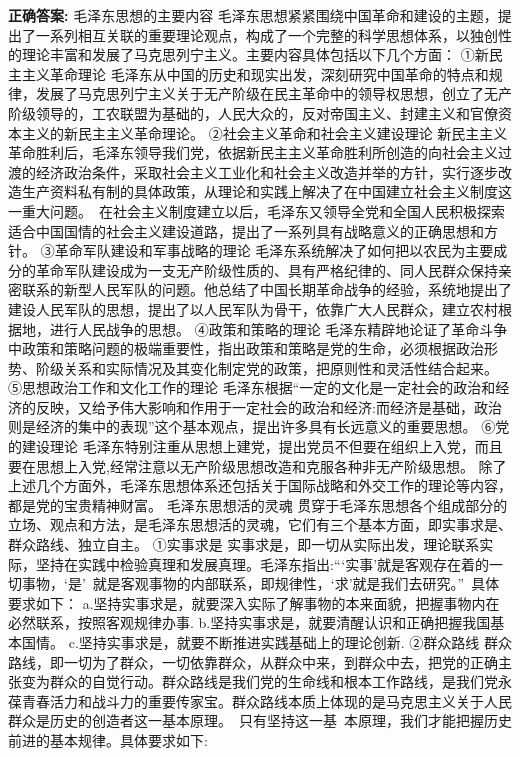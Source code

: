\documentclass[12pt,UTF8]{ctexart}
\begin{document}
\textbf{正确答案:}
毛泽东思想的主要内容
毛泽东思想紧紧围绕中国革命和建设的主题，提出了一系列相互关联的重要理论观点，构成了一个完整的科学思想体系，以独创性的理论丰富和发展了马克思列宁主义。主要内容具体包括以下几个方面：
①新民主主义革命理论
毛泽东从中国的历史和现实出发，深刻研究中国革命的特点和规律，发展了马克思列宁主义关于无产阶级在民主革命中的领导权思想，创立了无产阶级领导的，工农联盟为基础的，人民大众的，反对帝国主义、封建主义和官僚资本主义的新民主主义革命理论。
②社会主义革命和社会主义建设理论
新民主主义革命胜利后，毛泽东领导我们党，依据新民主主义革命胜利所创造的向社会主义过渡的经济政治条件，采取社会主义工业化和社会主义改造并举的方针，实行逐步改造生产资料私有制的具体政策，从理论和实践上解决了在中国建立社会主义制度这一重大问题。 在社会主义制度建立以后，毛泽东又领导全党和全国人民积极探索适合中国国情的社会主义建设道路，提出了一系列具有战略意义的正确思想和方针。
③革命军队建设和军事战略的理论
毛泽东系统解决了如何把以农民为主要成分的革命军队建设成为一支无产阶级性质的、具有严格纪律的、同人民群众保持亲密联系的新型人民军队的问题。他总结了中国长期革命战争的经验，系统地提出了建设人民军队的思想，提出了以人民军队为骨干，依靠广大人民群众，建立农村根据地，进行人民战争的思想。
④政策和策略的理论
毛泽东精辟地论证了革命斗争中政策和策略问题的极端重要性，指出政策和策略是党的生命，必须根据政治形势、阶级关系和实际情况及其变化制定党的政策，把原则性和灵活性结合起来。
⑤思想政治工作和文化工作的理论
毛泽东根据“一定的文化是一定社会的政治和经济的反映，又给予伟大影响和作用于一定社会的政治和经济:而经济是基础，政治则是经济的集中的表现”这个基本观点，提出许多具有长远意义的重要思想。
⑥党的建设理论
毛泽东特别注重从思想上建党，提出党员不但要在组织上入党，而且要在思想上入党,经常注意以无产阶级思想改造和克服各种非无产阶级思想。
除了上述几个方面外，毛泽东思想体系还包括关于国际战略和外交工作的理论等内容，都是党的宝贵精神财富。
毛泽东思想活的灵魂
贯穿于毛泽东思想各个组成部分的立场、观点和方法，是毛泽东思想活的灵魂，它们有三个基本方面，即实事求是、群众路线、独立自主。
①实事求是
实事求是，即一切从实际出发，理论联系实际，坚持在实践中检验真理和发展真理。毛泽东指出:“‘实事’就是客观存在着的一切事物，‘是’ 就是客观事物的内部联系，即规律性，‘求’就是我们去研究。” 具体要求如下：
a.坚持实事求是，就要深入实际了解事物的本来面貌，把握事物内在必然联系，按照客观规律办事.
b.坚持实事求是，就要清醒认识和正确把握我国基本国情。
c.坚持实事求是，就要不断推进实践基础上的理论创新.
②群众路线
群众路线，即一切为了群众，一切依靠群众，从群众中来，到群众中去，把党的正确主张变为群众的自觉行动。群众路线是我们党的生命线和根本工作路线，是我们党永葆青春活力和战斗力的重要传家宝。群众路线本质上体现的是马克思主义关于人民群众是历史的创造者这一基本原理。 只有坚持这一基 本原理，我们才能把握历史前进的基本规律。具体要求如下:
\end{document}
